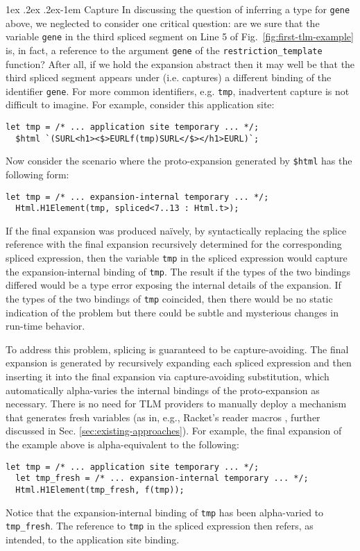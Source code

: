 \documentclass[acmsmall,screen]{acmart}
\makeatletter
\renewcommand{\subsubsection}{%
  \@startsection{subsubsection}{3}%
  {\z@}{1ex \@plus .2ex \@minus .2ex}{-1em}%
  {\sffamily\normalsize\itshape\maybe@addperiod}%
}
\newcommand{\maybe@addperiod}[1]{%
  #1\@addpunct{.}%
}
\newcommand{\li}[1]{\lstinline[basicstyle=\ttfamily\fontsize{9pt}{1em}\selectfont]{#1}}
\makeatother
\begin{document}
\subsubsection{Capture}
In discussing the question of inferring a type for \li{gene} above, we neglected to consider one critical question: are we sure that the variable \li{gene} in the third spliced segment on Line 5 of Fig.~\ref{fig:first-tlm-example} is, in fact, a reference to the argument \li{gene} of the \li{restriction_template} function? After all, if we hold the expansion abstract then it may well be that the third spliced segment appears under (i.e. captures) a different binding of the identifier \li{gene}. For more common identifiers, e.g. \li{tmp}, inadvertent capture is not difficult to imagine. For example, consider this application site:
\begin{lstlisting}[numbers=none]
  let tmp = /* ... application site temporary ... */;
  $html `(SURL<h1><$>EURLf(tmp)SURL</$></h1>EURL)`;
\end{lstlisting}
Now consider the scenario where the proto-expansion generated by \li{$html} has the following form:
\begin{lstlisting}[numbers=none]
  let tmp = /* ... expansion-internal temporary ... */;
  Html.H1Element(tmp, spliced<7..13 : Html.t>);
\end{lstlisting}
If the final expansion was produced na\"ively, by syntactically replacing the splice reference with the final expansion recursively determined for the corresponding spliced expression, then the  variable \li{tmp} in the spliced expression would capture the expansion-internal binding of \li{tmp}. The result if the types of the two bindings differed would be a type error exposing the internal details of the expansion. If the types of the two bindings of \li{tmp} coincided, then there would be no static indication of the problem but there could be subtle and mysterious changes in run-time behavior. %

To address this problem, splicing is guaranteed to be capture-avoiding. The final expansion is generated by recursively expanding each spliced expression and then inserting it into the final expansion via capture-avoiding substitution, which automatically alpha-varies the internal bindings of the proto-expansion as necessary. There is no need for TLM providers to manually deploy a mechanism that generates fresh variables (as in, e.g., Racket's reader macros \cite{Flatt:2012:CLR:2063176.2063195}, further discussed in Sec. \ref{sec:existing-approaches}). For example, the final expansion of the example above is alpha-equivalent to the following:
\begin{lstlisting}[numbers=none]
  let tmp = /* ... application site temporary ... */; 
  let tmp_fresh = /* ... expansion-internal temporary ... */;
  Html.H1Element(tmp_fresh, f(tmp));
\end{lstlisting}
Notice that the expansion-internal binding of \li{tmp} has been alpha-varied to \li{tmp_fresh}. The reference to \li{tmp} in the spliced expression then refers, as intended, to the application site binding. 
\end{document}
